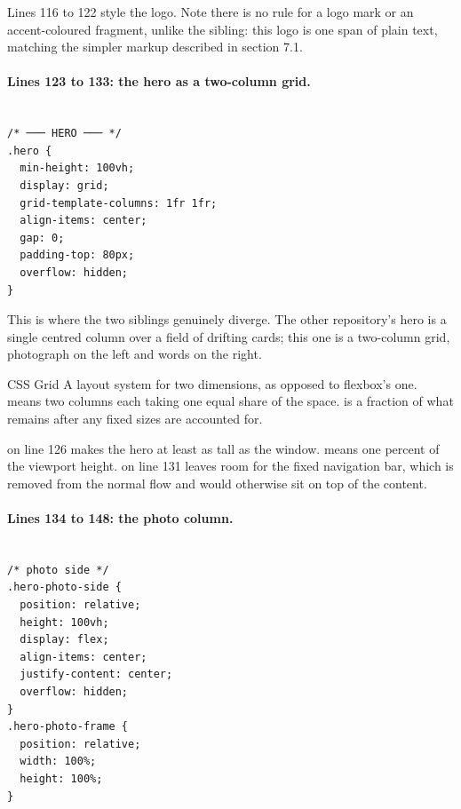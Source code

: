 Lines 116 to 122 style the logo. Note there is no rule for a logo mark or an
accent-coloured fragment, unlike the sibling: this logo is one span of plain text,
matching the simpler markup described in section 7.1.

\paragraph{Lines 123 to 133: the hero as a two-column grid.}

\begin{lstlisting}[firstnumber=123,caption={\file{css/site.css}, lines 123--133}]

/* ─── HERO ─── */
.hero {
  min-height: 100vh;
  display: grid;
  grid-template-columns: 1fr 1fr;
  align-items: center;
  gap: 0;
  padding-top: 80px;
  overflow: hidden;
}
\end{lstlisting}

This is where the two siblings genuinely diverge. The other repository's hero is a
single centred column over a field of drifting cards; this one is a two-column
grid, photograph on the left and words on the right.

\begin{jargon}{CSS Grid}
A layout system for two dimensions, as opposed to flexbox's one.
 means two columns each taking one equal
share of the space.  is a fraction of what remains after any fixed sizes
are accounted for.
\end{jargon}

 on line 126 makes the hero at least as tall as the window.
 means one percent of the viewport height.  on
line 131 leaves room for the fixed navigation bar, which is removed from the normal
flow and would otherwise sit on top of the content.

\paragraph{Lines 134 to 148: the photo column.}

\begin{lstlisting}[firstnumber=134,caption={\file{css/site.css}, lines 134--148}]

/* photo side */
.hero-photo-side {
  position: relative;
  height: 100vh;
  display: flex;
  align-items: center;
  justify-content: center;
  overflow: hidden;
}
.hero-photo-frame {
  position: relative;
  width: 100%;
  height: 100%;
}
\end{lstlisting}


